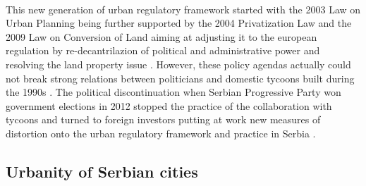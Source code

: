 \documentclass[11pt]{report}
\begin{document}
\\
This new generation of urban regulatory framework started with the 2003 Law on Urban Planning being further supported by the 2004 Privatization Law  and the 2009 Law on Conversion of Land aiming at adjusting it to the european regulation by re-decantrilazion of political and administrative power and resolving the land property issue \cite{Cagic 2014}. However, these policy agendas actually could not break strong relations between politicians and domestic tycoons built during the 1990s \cite{Peric 2016}.
The political discontinuation when Serbian Progressive Party won government elections in 2012 stopped the practice of the collaboration with tycoons and turned to foreign investors putting at work new measures of distortion onto the urban regulatory framework and practice in Serbia \cite{Peric 2016}.
            
\subsection{Urbanity of Serbian cities}
\end{document}
